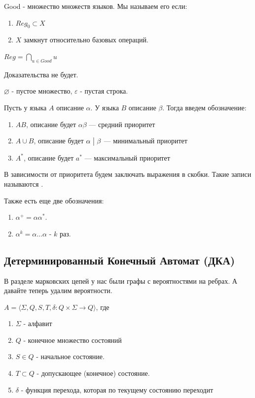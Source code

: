Good - множество множеств языков. Мы называем его  если:
\begin{enumerate}
    \item $Reg_0 \subset X$
    \item $X$ замкнут относительно базовых операций.
\end{enumerate}

 $Reg = \bigcap\limits_{u \in Good} u$

Доказательства не будет.

$\varnothing$ - пустое множество, $\varepsilon$ - пустая строка.

Пусть у языка $A$ описание $\alpha$. У языка $B$ описание $\beta$. Тогда введем обозначение:

\begin{enumerate}
    \item $AB$, описание будет $\alpha \beta$ --- средний приоритет
    \item $A \cup B$, описание будет $\alpha \bigm| \beta$ --- минимальный приоритет
    \item $A^*$, описание будет $a^*$ --- максимальный приоритет
\end{enumerate}

В зависимости от приоритета будем заключать выражения в скобки. Такие записи называются .

Также есть еще две обозначения:
\begin{enumerate}
    \item $\alpha^+  = \alpha \alpha^* $.
    \item $\alpha^k = \alpha\ldots \alpha$ - $k$ раз.
\end{enumerate}

\subsection{Детерминированный Конечный Автомат (ДКА)}

В разделе марковских цепей у нас были графы с вероятностями на ребрах. А давайте теперь удалим вероятности. 

$A = \langle \Sigma, Q,S,T, \delta: Q \times \Sigma \rightarrow Q \rangle$, где

\begin{enumerate}
    \item $\Sigma$ - алфавит
    \item $Q$ - конечное множество состояний
    \item $S\in Q$ - начальное состояние.
    \item $T\subset Q$ - допускающее (конечное) состояние. 
    \item $\delta$ - функция перехода, которая по текущему состоянию переходит
\end{enumerate}

